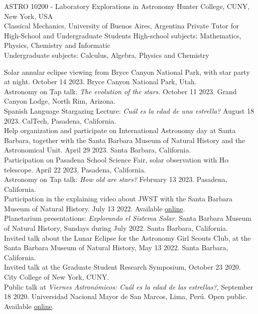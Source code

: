 \documentclass[10pt]{cv}
\begin{document}
\begin{llist}
ASTRO 10200 - Laboratory Explorations in Astronomy
Hunter College, CUNY, New York, USA\\
Classical Mechanics, University of Buenos Aires, Argentina
Private Tutor for High-School and Undergraduate Students
High-school subjects: Mathematics, Physics, Chemistry and Informatic\\
Undergraduate subjects: Calculus, Algebra, Physics and Chemistry 


Solar annular eclipse viewing from Bryce Canyon National Park, with star party at night. October 14 2023. Bryce Canyon National Park, Utah.  \\
Astronomy on Tap talk: \textit{The evolution of the stars.} October 11 2023. Grand Canyon Lodge, North Rim, Arizona.\\
Spanish Language Stargazing Lecture: \textit{Cu\'al es la edad de una estrella?} August 18 2023. CalTech, Pasadena, California. \\
Help organization and participate on International Astronomy day at Santa Barbara, together with the Santa Barbara Museum of Natural History and the Astronomical Unit. April 29 2023. Santa Barbara, California.\\
Participation on Pasadena School Science Fair, solar observation with H$\alpha$ telescope. April 22 2023. Pasadena, California. \\
Astronomy on Tap talk: \textit{How old are stars?} February 13 2023. Pasadena, California.\\
Participation in the explaining video about JWST with the Santa Barbara Museum of Natural History. July 13 2022. Available \href{https://www.youtube.com/watch?v=LV8N0OSEJOg}{online}.\\
Planetarium presentations: \textit{Explorando el Sistema Solar.} Santa Barbara Museum of Natural History, Sundays during July 2022. Santa Barbara, California. \\
Invited talk about the Lunar Eclipse for the Astronomy Girl Scouts Club, at the Santa Barbara Museum of Natural History, May 13 2022. Santa Barbara, California. \\
Invited talk at the Graduate Student Research Symposium, October 23 2020. City College of New York, CUNY.	\\
Public talk at \textit{Viernes Astron\'omicos: Cu\'al es la edad de las estrellas?}, September 18 2020. Universidad Nacional Mayor de San Marcos, Lima, Per\'u. Open public. Available \href{https://www.youtube.com/watch?v=QOlgG1b41hU&ab_channel=AstronomySanMarcos}{online}.\\

\end{llist}
\end{document}
